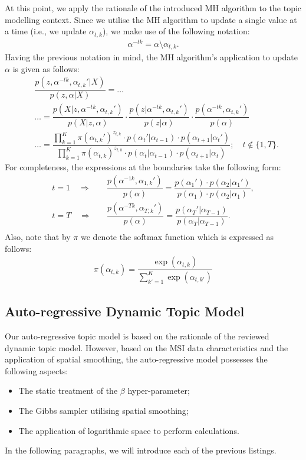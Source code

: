 \documentclass{mpaper}
\begin{document}
\par At this point, we apply the rationale of the introduced MH algorithm to the topic modelling context. Since we utilise the MH algorithm to update a single value at a time (i.e., we update $\alpha_{t,k}$), we make use of the following notation:
\begin{align*}
  \alpha^{-tk} = \alpha \setminus \alpha_{t,k}.
\end{align*} 
Having the previous notation in mind, the MH algorithm's application to update $\alpha$ is given as follows:
\begin{align*}
  &\dfrac{p(z,\alpha^{-tk},\alpha_{t, k}'|X)}{p(z,\alpha|X)} = \ldots\\
  &\ldots = \dfrac{p(X|z,\alpha^{-tk},\alpha_{t, k}')}{p(X|z,\alpha)}\cdot \dfrac{p(z|\alpha^{-tk},\alpha_{t, k}')}{p(z|\alpha)}\cdot \dfrac{p(\alpha^{-tk},\alpha_{t, k}')}{p(\alpha)}\\
  &\dots = \dfrac{\prod_{k=1}^K\pi(\alpha_{t,k}')^{z_{t,k}}\cdot p(\alpha_t'|\alpha_{t-1})\cdot p(\alpha_{t+1}|\alpha_t')}{\prod_{k=1}^K\pi(\alpha_{t,k})^{z_{t,k}}\cdot p(\alpha_t|\alpha_{t-1})\cdot p(\alpha_{t+1}|\alpha_t)};\quad t \not\in \{1,T\}.
\end{align*}
For completeness, the expressions at the boundaries take the following form:
\begin{align*}
t=1 \quad \Longrightarrow \quad &\dfrac{p(\alpha^{-1k},\alpha_{1, k}')}{p(\alpha)} = \dfrac{p(\alpha_{1}')\cdot p(\alpha_{2}|\alpha_{1}')}{p(\alpha_{1})\cdot p(\alpha_{2}|\alpha_{1})},\\
t=T \quad \Longrightarrow \quad &\dfrac{p(\alpha^{-Tk},\alpha_{T, k}')}{p(\alpha)} = \dfrac{p(\alpha_{T}'|\alpha_{T-1})}{p(\alpha_{T}|\alpha_{T-1})}.\\
\end{align*}
Also, note that by $\pi$ we denote the softmax function which is expressed as follows:
\begin{align*}
  \pi(\alpha_{t,k}) = \dfrac{\exp(\alpha_{t,k})}{\sum_{k'=1}^K \exp(\alpha_{t,k'})}
\end{align*} 

\subsection{Auto-regressive Dynamic Topic Model}

\par Our auto-regressive topic model is based on the rationale of the reviewed dynamic topic model. However, based on the MSI data characteristics and the application of spatial smoothing, the auto-regressive model possesses the following aspects:
\begin{itemize}
	\item The static treatment of the $\beta$ hyper-parameter;
	\item The Gibbs sampler utilising spatial smoothing;
	\item The application of logarithmic space to perform calculations.
\end{itemize}
In the following paragraphs, we will introduce each of the previous listings.
\end{document}
